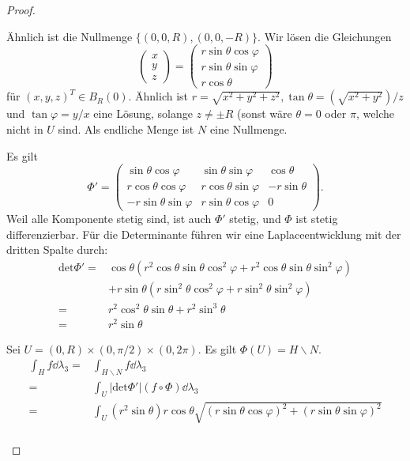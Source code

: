 \begin{proof}
	\begin{parts}
	\item Ähnlich ist die Nullmenge $\{(0,0,R),(0,0,-R)\} $. Wir lösen die Gleichungen
		\[
			\begin{pmatrix} x \\ y \\ z \end{pmatrix} =\begin{pmatrix} r\sin\theta\cos\varphi \\ r\sin\theta\sin\varphi \\ r\cos\theta \end{pmatrix} 
		\]
		f\"{u}r $(x,y,z)^T\in B_R(0)$. Ähnlich ist $r=\sqrt{x^2+y^2+z^2}, \tan\theta = (\sqrt{x^2+y^2} ) / z$ und $\tan\varphi=y / x$ eine Lösung, solange $z\neq\pm R$ (sonst wäre $\theta=0$ oder $\pi$, welche nicht in $U$ sind. Als endliche Menge ist $N$ eine Nullmenge.
	\item Es gilt
		\[
			\Phi'=\begin{pmatrix} \sin\theta\cos\varphi & \sin\theta\sin\varphi & \cos\theta \\ r\cos\theta\cos\varphi & r\cos\theta\sin\varphi & -r\sin\theta \\ -r\sin\theta\sin\varphi & r\sin\theta\cos\varphi & 0 \end{pmatrix} 
		.\] 
		Weil alle Komponente stetig sind, ist auch $\Phi'$ stetig, und $\Phi$ ist stetig differenzierbar. F\"{u}r die Determinante f\"{u}hren wir eine Laplaceentwicklung mit der dritten Spalte durch:
		\begin{align*}
			\text{det}\Phi'=&\cos\theta(r^2\cos\theta\sin\theta\cos^2\varphi+r^2\cos\theta\sin\theta\sin^2\varphi)\\
					&+r\sin\theta(r\sin^2\theta\cos^2\varphi+r\sin^2\theta\sin^2\varphi)\\
			=&r^2\cos^2\theta\sin\theta+r^2\sin^3\theta\\
			=&r^2\sin\theta
		\end{align*}
	\item Sei $U=(0,R)\times (0,\pi / 2)\times (0,2\pi)$. Es gilt $\Phi(U)=H\backslash N$.
		 \begin{align*}
			 \int_H f\dd{\lambda_3}=&\int_{H\backslash N}f\dd{\lambda_3}\\
			 =&\int_U |\text{det}\Phi'|(f\circ \Phi)\dd{\lambda_3}\\
			 =&\int_U (r^2\sin\theta)r\cos\theta\sqrt{(r\sin\theta\cos\varphi)^2+(r\sin\theta\sin\varphi)^2} \\

\end{align*}
\end{parts}
\end{proof}
